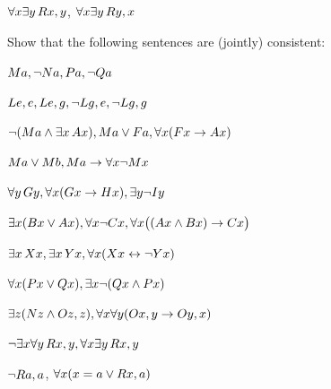 \begin{practiceproblems}
\begin{problemslist}
		\item $\forall x\exists y\,\mathord{R}x,y$, $\forall x\exists y\,\mathord{R}y,x$
		
	\end{problemslist}
	
	
	\problempart
	Show that the following sentences are (jointly) consistent:
	\begin{problemslist}
		\item $\mathord{M}a, \neg \mathord{N}a, Pa, \neg \mathord{Q}a$
		\item $\mathord{L}e,e, \mathord{L}e,g, \neg \mathord{L}g,e, \neg \mathord{L}g,g$
		\item $\neg (\mathord{M}a \mathbin{\wedge} \exists x\,\mathord{A}x), Ma \vee \mathord{F}a, \forall x(\mathord{F}x \rightarrow \mathord{A}x)$
		\item $\mathord{M}a \vee \mathord{M}b, \mathord{M}a \rightarrow \forall x \neg \mathord{M}x$
		\item $\forall y\,\mathord{G}y, \forall x (\mathord{G}x \rightarrow \mathord{H}x), \exists y \neg \mathord{I}y$
		\item $\exists x(\mathord{B}x \vee \mathord{A}x), \forall x \neg \mathord{C}x, \forall x\bigl((\mathord{A}x \mathbin{\wedge} \mathord{B}x) \rightarrow Cx\bigr)$
		\item $\exists x\,\mathord{X}x, \exists x\,\mathord{Y}x, \forall x(\mathord{X}x \leftrightarrow \neg \mathord{Y}x)$
		\item $\forall x(\mathord{P}x \vee \mathord{Q}x), \exists x\neg(\mathord{Q}x \mathbin{\wedge} \mathord{P}x)$
		\item $\exists z(\mathord{N}z \mathbin{\wedge} \mathord{O}z,z), \forall x\forall y(\mathord{O}x,y \rightarrow \mathord{O}y,x)$
		\item $\neg \exists x \forall y\,\mathord{R}x,y, \forall x \exists y\,\mathord{R}x,y$
		\item $\neg \mathord{R}a,a$, $\forall x (x=a \vee \mathord{R}x,a)$
		

\end{problemslist}
\end{practiceproblems}
